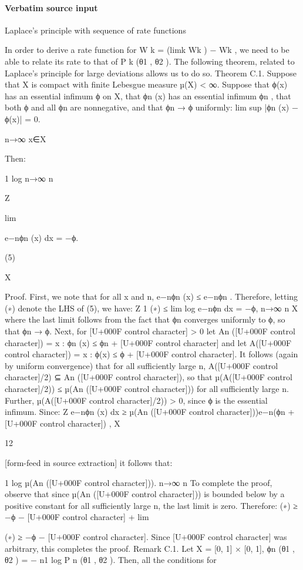 \documentclass[10pt]{article}
\begin{document}
\paragraph{Verbatim source input}
\begin{ReviewVerbatim}
Laplace’s principle with sequence of rate functions

In order to derive a rate function for W k = (limk Wk ) − Wk , we need to be able to relate its rate to
that of P k (θ1 , θ2 ). The following theorem, related to Laplace’s principle for large deviations allows
us to do so.
Theorem C.1. Suppose that X is compact with finite Lebesgue measure µ(X) < ∞. Suppose that
ϕ(x) has an essential infimum ϕ on X, that ϕn (x) has an essential infimum ϕn , that both ϕ and
all ϕn are nonnegative, and that ϕn → ϕ uniformly:
lim sup |ϕn (x) − ϕ(x)| = 0.

n→∞ x∈X

Then:

1
log
n→∞ n

Z

lim

e−nϕn (x) dx = −ϕ.

(5)

X

Proof. First, we note that for all x and n, e−nϕn (x) ≤ e−nϕn . Therefore, letting (∗) denote the
LHS of (5), we have:
Z
1
(∗) ≤ lim log
e−nϕn dx = −ϕ,
n→∞ n
X
where the last limit follows from the fact that ϕn converges uniformly to ϕ, so that ϕn → ϕ.
Next, for [U+000F control character] > 0 let An ([U+000F control character]) = {x : ϕn (x) ≤ ϕn + [U+000F control character]} and let A([U+000F control character]) = {x : ϕ(x) ≤ ϕ + [U+000F control character]}. It
follows (again by uniform convergence) that for all sufficiently large n, A([U+000F control character]/2) ⊆ An ([U+000F control character]), so that
µ(A([U+000F control character]/2)) ≤ µ(An ([U+000F control character])) for all sufficiently large n. Further, µ(A([U+000F control character]/2)) > 0, since ϕ is the essential
infimum.
Since:
Z
e−nϕn (x) dx ≥ µ(An ([U+000F control character]))e−n(ϕn +[U+000F control character]) ,
X

12


[form-feed in source extraction]
it follows that:

1
log µ(An ([U+000F control character])).
n→∞ n
To complete the proof, observe that since µ(An ([U+000F control character])) is bounded below by a positive constant for all
sufficiently large n, the last limit is zero. Therefore:
(∗) ≥ −ϕ − [U+000F control character] + lim

(∗) ≥ −ϕ − [U+000F control character].
Since [U+000F control character] was arbitrary, this completes the proof.
Remark C.1. Let X = [0, 1] × [0, 1], ϕn (θ1 , θ2 ) = − n1 log P n (θ1 , θ2 ). Then, all the conditions for
\end{ReviewVerbatim}
\end{document}
